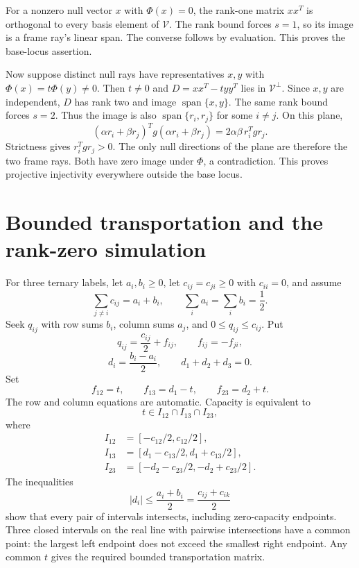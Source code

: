 For a nonzero null vector \(x\) with \(\Phi(x)=0\), the rank-one matrix
\(xx^T\) is orthogonal to every basis element of \(\mathcal V\). The
rank bound forces \(s=1\), so its image is a frame ray's linear span.
The converse follows by evaluation. This proves the base-locus assertion.

Now suppose distinct null rays have representatives \(x,y\) with
\(\Phi(x)=t\Phi(y)\ne0\). Then \(t\ne0\) and
\(D=xx^T-t yy^T\) lies in \(\mathcal V^\perp\).
Since \(x,y\) are independent, \(D\) has rank two and image
\(\operatorname{span}\{x,y\}\). The same rank bound forces \(s=2\).
Thus the image is also \(\operatorname{span}\{r_i,r_j\}\) for some
\(i\ne j\). On this plane,
\[
 (\alpha r_i+\beta r_j)^Tg(\alpha r_i+\beta r_j)
 =2\alpha\beta\,r_i^Tg r_j .
\]
Strictness gives \(r_i^Tg r_j>0\). The only null directions of the
plane are therefore the two frame rays. Both have zero image under
\(\Phi\), a contradiction. This proves projective injectivity everywhere
outside the base locus.

\section{Bounded transportation and the rank-zero simulation}
\label{app:transport}

For three ternary labels, let \(a_i,b_i\ge0\), let
\(c_{ij}=c_{ji}\ge0\) with \(c_{ii}=0\), and assume
\[
\sum_{j\ne i}c_{ij}=a_i+b_i,\qquad
\sum_i a_i=\sum_i b_i=\frac12.
\]
Seek \(q_{ij}\) with row sums \(b_i\), column sums \(a_j\), and
\(0\le q_{ij}\le c_{ij}\). Put
\[
q_{ij}=\frac{c_{ij}}2+f_{ij},\qquad f_{ij}=-f_{ji},
\]
\[
d_i=\frac{b_i-a_i}{2},\qquad d_1+d_2+d_3=0.
\]
Set
\[
f_{12}=t,\qquad f_{13}=d_1-t,\qquad f_{23}=d_2+t.
\]
The row and column equations are automatic. Capacity is equivalent to
\[
t\in I_{12}\cap I_{13}\cap I_{23},
\]
where
\[
\begin{aligned}
I_{12}&=[-c_{12}/2,c_{12}/2],\\
I_{13}&=[d_1-c_{13}/2,d_1+c_{13}/2],\\
I_{23}&=[-d_2-c_{23}/2,-d_2+c_{23}/2].
\end{aligned}
\]
The inequalities
\[
|d_i|\le\frac{a_i+b_i}{2}
=\frac{c_{ij}+c_{ik}}2
\]
show that every pair of intervals intersects, including zero-capacity
endpoints. Three closed intervals on the real line with pairwise
intersections have a common point: the largest left endpoint does not exceed
the smallest right endpoint. Any common \(t\) gives the required bounded
transportation matrix.


